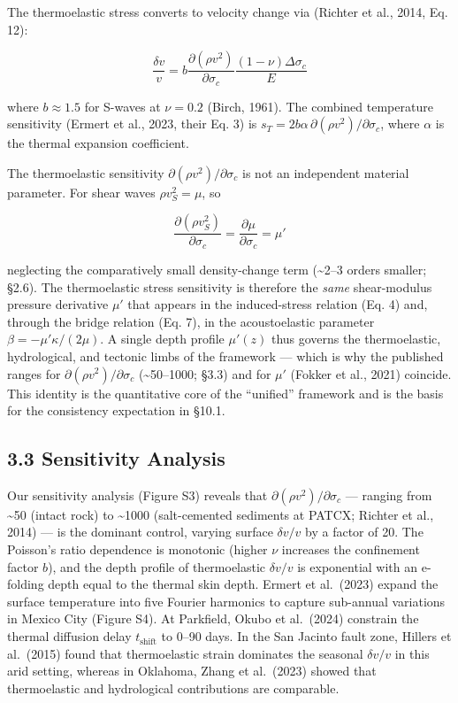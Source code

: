\documentclass[draft]{agujournal2019}
\begin{document}
The thermoelastic stress converts to velocity change via (Richter et
al., 2014, Eq. 12):

\[\frac{\delta v}{v} = b \frac{\partial(\rho v^2)}{\partial \sigma_c} \frac{(1-\nu)\Delta\sigma_c}{E} \tag{9}\]

where \(b \approx 1.5\) for S-waves at \(\nu = 0.2\) (Birch, 1961). The
combined temperature sensitivity (Ermert et al., 2023, their Eq. 3) is
\(s_T = 2b\alpha \, \partial(\rho v^2)/\partial\sigma_c\), where
\(\alpha\) is the thermal expansion coefficient.

The thermoelastic sensitivity \(\partial(\rho v^2)/\partial\sigma_c\) is
not an independent material parameter. For shear waves
\(\rho v_S^2 = \mu\), so

\[\frac{\partial(\rho v_S^2)}{\partial\sigma_c} = \frac{\partial\mu}{\partial\sigma_c} = \mu' \tag{9b}\]

neglecting the comparatively small density-change term
(\textasciitilde{}2--3 orders smaller; §2.6). The thermoelastic stress
sensitivity is therefore the \emph{same} shear-modulus pressure
derivative \(\mu'\) that appears in the induced-stress relation (Eq. 4)
and, through the bridge relation (Eq. 7), in the acoustoelastic
parameter \(\beta = -\mu'\kappa/(2\mu)\). A single depth profile
\(\mu'(z)\) thus governs the thermoelastic, hydrological, and tectonic
limbs of the framework --- which is why the published ranges for
\(\partial(\rho v^2)/\partial\sigma_c\) (\textasciitilde{}50--1000;
§3.3) and for \(\mu'\) (Fokker et al., 2021) coincide. This identity is
the quantitative core of the ``unified'' framework and is the basis for
the consistency expectation in §10.1.

\subsection{3.3 Sensitivity Analysis}\label{sensitivity-analysis}

Our sensitivity analysis (Figure S3) reveals that
\(\partial(\rho v^2)/\partial\sigma_c\) --- ranging from
\textasciitilde{}50 (intact rock) to \textasciitilde{}1000
(salt-cemented sediments at PATCX; Richter et al., 2014) --- is the
dominant control, varying surface \(\delta v/v\) by a factor of 20. The
Poisson's ratio dependence is monotonic (higher \(\nu\) increases the
confinement factor \(b\)), and the depth profile of thermoelastic
\(\delta v/v\) is exponential with an e-folding depth equal to the
thermal skin depth. Ermert et al.~(2023) expand the surface temperature
into five Fourier harmonics to capture sub-annual variations in Mexico
City (Figure S4). At Parkfield, Okubo et al.~(2024) constrain the
thermal diffusion delay \(t_{\text{shift}}\) to 0--90 days. In the San
Jacinto fault zone, Hillers et al.~(2015) found that thermoelastic
strain dominates the seasonal \(\delta v/v\) in this arid setting,
whereas in Oklahoma, Zhang et al.~(2023) showed that thermoelastic and
hydrological contributions are comparable.
\end{document}

